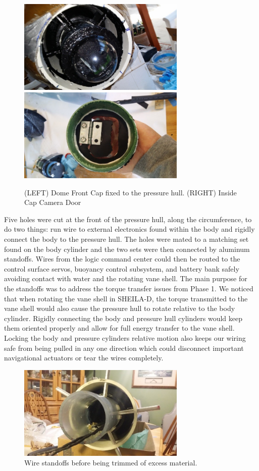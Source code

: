 \documentclass{report}
\begin{document}
\begin{figure}[H]
\centering
\includegraphics[width=8cm]{"PHFront"}
\includegraphics[width=8cm]{"CameraDome"}
\caption{(LEFT) Dome Front Cap fixed to the pressure hull. (RIGHT) Inside Cap Camera Door}
\end{figure}
Five holes were cut at the front of the pressure hull, along the circumference, to do two things: run wire to external electronics found within the body and rigidly connect the body to the pressure hull.  The holes were mated to a matching set found on the body cylinder and the two sets were then connected by aluminum standoffs.  Wires from the logic command center could then be routed to the control surface servos, buoyancy control subsystem, and battery bank safely avoiding contact with water and the rotating vane shell.  The main purpose for the standoffs was to address the torque transfer issues from Phase 1.  We noticed that when rotating the vane shell in SHEILA-D, the torque transmitted to the vane shell would also cause the pressure hull to rotate relative to the body cylinder.  Rigidly connecting the body and pressure hull cylinders would keep them oriented properly and allow for full energy transfer to the vane shell.  Locking the body and pressure cylinders relative motion also keeps our wiring safe from being pulled in any one direction which could disconnect important navigational actuators or tear the wires completely.
\begin{figure}[H]
\centering
\includegraphics[width=8cm]{"standoffs"}
\caption{Wire standoffs before being trimmed of excess material.}
\end{figure}
\end{document}
